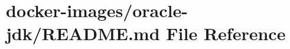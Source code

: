 \hypertarget{docker-images_2oracle-jdk_2_r_e_a_d_m_e_8md}{}\section{docker-\/images/oracle-\/jdk/\+R\+E\+A\+D\+ME.md File Reference}
\label{docker-images_2oracle-jdk_2_r_e_a_d_m_e_8md}
